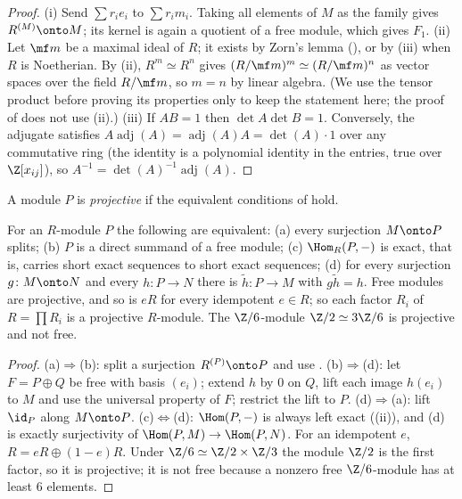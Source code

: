 \begin{proof}
(i) Send $\sum r_ie_i$ to $\sum r_im_i$. Taking all elements of $M$ as the family gives $R^{(M)}\onto M$; its kernel is again a
quotient of a free module, which gives $F_1$.
(ii) Let $\mf m$ be a maximal ideal of $R$; it exists by Zorn's lemma (), or by (iii)
when $R$ is Noetherian. By (ii), $R^m\simeq R^n$ gives $(R/\mf m)^m\simeq(R/\mf m)^n$ as vector spaces over the
field $R/\mf m$, so $m=n$ by linear algebra. (We use the tensor product before proving its properties only to keep the
statement here; the proof of  does not use (ii).)
(iii) If $AB=1$ then $\det A\det B=1$. Conversely, the adjugate satisfies $A\operatorname{adj}(A)=\operatorname{adj}(A)A=\det(A)\cdot1$ over any
commutative ring (the identity is a polynomial identity in the entries, true over $\Z[x_{ij}]$), so $A^{-1}=\det(A)^{-1}\operatorname{adj}(A)$.
\end{proof}

\begin{definition}\label{def:modules:projective}
A module $P$ is \emph{projective} if the equivalent conditions of  hold.
\end{definition}

\begin{proposition}\label{prop:modules:projective}
For an $R$-module $P$ the following are equivalent:
(a) every surjection $M\onto P$ splits;
(b) $P$ is a direct summand of a free module;
(c) $\Hom_R(P,-)$ is exact, that is, carries short exact sequences to short exact sequences;
(d) for every surjection $g\colon M\onto N$ and every $h\colon P\to N$ there is $\tilde h\colon P\to M$ with $g\tilde h=h$.
Free modules are projective, and so is $eR$ for every idempotent $e\in R$; so each factor $R_i$ of $R=\prod R_i$ is a projective
$R$-module. The $\Z/6$-module $\Z/2\simeq3\Z/6$ is projective and not free.
\end{proposition}

\begin{proof}
(a)$\Rightarrow$(b): split a surjection $R^{(P)}\onto P$ and use .
(b)$\Rightarrow$(d): let $F=P\oplus Q$ be free with basis $(e_i)$; extend $h$ by $0$ on $Q$, lift each image $h(e_i)$ to $M$
and use the universal property of $F$; restrict the lift to $P$.
(d)$\Rightarrow$(a): lift $\id_P$ along $M\onto P$.
(c)$\Leftrightarrow$(d): $\Hom(P,-)$ is always left exact ((ii)), and (d) is exactly surjectivity of
$\Hom(P,M)\to\Hom(P,N)$.
For an idempotent $e$, $R=eR\oplus(1-e)R$. Under $\Z/6\simeq\Z/2\times\Z/3$ the module $\Z/2$ is the first factor, so it is projective;
it is not free because a nonzero free $\Z/6$-module has at least $6$ elements.
\end{proof}

